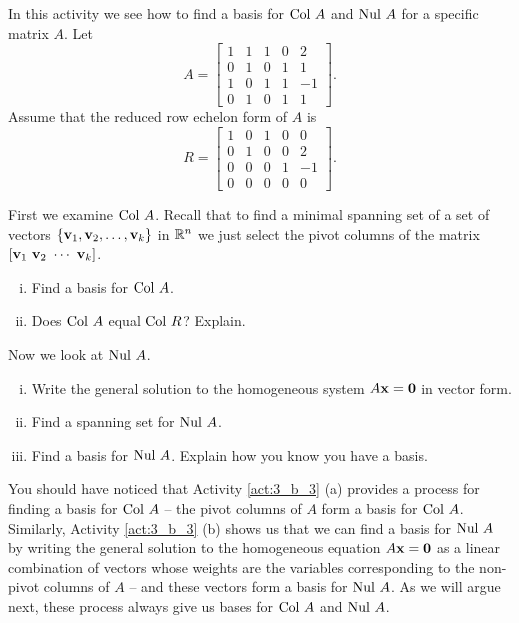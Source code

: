 \begin{activity} \label{act:3_b_3} In this activity we see how to find a basis for $\text{Col } A$ and $\text{Nul } A$ for a specific matrix $A$. Let 
\[A =  \left[ \begin{array}{rrrrr} 1&1&1&0&2 \\ 0&1&0&1&1 \\ 1&0&1&1&-1 \\ 0&1&0&1&1 \end{array} \right].\] Assume that the reduced row echelon form of $A$ is 
\[R= \left[ \begin{array}{rrrrr} 1&0&1&0&0 \\ 0&1&0&0&2 \\ 0&0&0&1&-1 \\ 0&0&0&0&0\end{array} \right].\] 
\ba 
\item First we examine $\text{Col } A$. Recall that to find a minimal spanning set of a set of vectors $\{\mathbf{v}_1, \mathbf{v}_2, \ldots, \mathbf{v}_k\}$ in $\mathbb{R}^n$ we just select the pivot columns of the matrix $[\mathbf{v}_1  \ \mathbf{v}_2  \ \cdots \  \mathbf{v}_k]$. 
	\begin{enumerate}[i.]
	\item Find a basis for $\text{Col } A$.



	\item Does $\text{Col } A$ equal $\text{Col } R$? Explain.
	


	\end{enumerate}
	
\item Now we look at $\text{Nul } A$. 
	\begin{enumerate}[i.]
	\item Write the general solution to the homogeneous system $A \mathbf{x} = \mathbf{0}$ in vector form. 



	\item Find a spanning set for $\text{Nul } A$. 



	\item Find a basis for $\text{Nul } A$. Explain how you know you have a basis.  



	\end{enumerate}

\ea

\end{activity}


You should have noticed that Activity \ref{act:3_b_3} (a) provides a process for finding a basis for $\text{Col } A$ -- the pivot columns of $A$ form a basis for $\text{Col } A$. Similarly, Activity \ref{act:3_b_3} (b) shows us that we can find a basis for $\text{Nul } A$ by writing the general solution to the homogeneous equation $A\mathbf{x} = \mathbf{0}$ as a linear combination of vectors whose weights are the variables corresponding to the non-pivot columns of $A$ -- and these vectors form a basis for $\text{Nul } A$. As we will argue next, these process always give us bases for $\text{Col } A$ and $\text{Nul } A$. 

